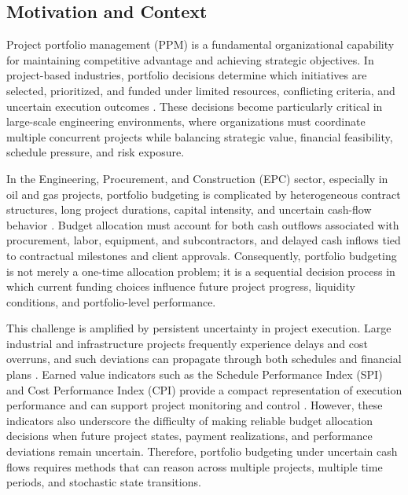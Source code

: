 \subsection{Motivation and Context}

Project portfolio management (PPM) is a fundamental organizational capability for maintaining competitive advantage and achieving strategic objectives. In project-based industries, portfolio decisions determine which initiatives are selected, prioritized, and funded under limited resources, conflicting criteria, and uncertain execution outcomes \citep{archer1999integrated,cooper2001portfolio,martinsuo2013project,killen2008project}. These decisions become particularly critical in large-scale engineering environments, where organizations must coordinate multiple concurrent projects while balancing strategic value, financial feasibility, schedule pressure, and risk exposure.

In the Engineering, Procurement, and Construction (EPC) sector, especially in oil and gas projects, portfolio budgeting is complicated by heterogeneous contract structures, long project durations, capital intensity, and uncertain cash-flow behavior \citep{merrow2011industrial,cui2010systems,kenley1986construction,kaka1993towards}. Budget allocation must account for both cash outflows associated with procurement, labor, equipment, and subcontractors, and delayed cash inflows tied to contractual milestones and client approvals. Consequently, portfolio budgeting is not merely a one-time allocation problem; it is a sequential decision process in which current funding choices influence future project progress, liquidity conditions, and portfolio-level performance.

This challenge is amplified by persistent uncertainty in project execution. Large industrial and infrastructure projects frequently experience delays and cost overruns, and such deviations can propagate through both schedules and financial plans \citep{flyvbjerg2002underestimating,flyvbjerg2003underestimating,love2013probability,love2016relationship}. Earned value indicators such as the Schedule Performance Index (SPI) and Cost Performance Index (CPI) provide a compact representation of execution performance and can support project monitoring and control \citep{fleming2016earned,lipke2009prediction,vanhoucke2012integrated}. However, these indicators also underscore the difficulty of making reliable budget allocation decisions when future project states, payment realizations, and performance deviations remain uncertain. Therefore, portfolio budgeting under uncertain cash flows requires methods that can reason across multiple projects, multiple time periods, and stochastic state transitions.

